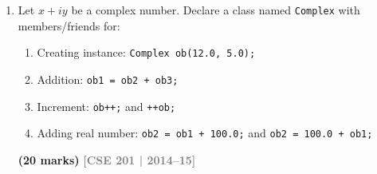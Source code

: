 \documentclass[12pt,a3paper]{article}
\newcommand{\yr}[1]{\hfill\textcolor{gray}{\small\textbf{[#1]}}}
\newcommand{\mk}[1]{\textcolor{orange!70!black}{\small\textbf{(#1 marks)}}}
\begin{document}
\begin{enumerate}
\begin{tcolorbox}
\begin{lstlisting}[language=C++]
    void print() const {
        cout << pointname << "(" << x << "," << y << ")" << endl;
    }
};

int main() {
    Coord ob1, ob2, ob3;
    Coord ob4(0, 0, "origin");

    // (c) ob1 = ob2 + ob3 + ob4
    ob1 = ob2 + ob3 + ob4;
    ob1.print();

    // (c) ob1 = 100 + ob2
    ob1 = 100 + ob2;
    ob1.print();

    // (c) int value = 100 + ob4 (uses conversion)
    int value = (int)(100 + (double)ob4);
    cout << "value = " << value << endl;

    // (d) prefix and postfix
    ++ob1;
    ob1++;
    ob1.print();
    return 0;
}
\end{lstlisting}

\textbf{(b) Why copy constructor works for init but not assignment:}

The copy constructor is called only during \textbf{initialization}
(e.g., \texttt{Coord c2 = c1}). For \textbf{assignment}
(\texttt{c2 = c1} after both are constructed), the
\texttt{operator=} is called instead. Without a custom
\texttt{operator=}, the default does a shallow copy of the
\texttt{char*} pointer, causing double-free bugs --- hence the
explicit \texttt{operator=} above.
\end{tcolorbox}

\item Let $x+iy$ be a complex number. Declare a class named \texttt{Complex} with members/friends for:
\begin{enumerate}
  \item Creating instance: \texttt{Complex ob(12.0, 5.0);}
  \item Addition: \texttt{ob1 = ob2 + ob3;}
  \item Increment: \texttt{ob++;} and \texttt{++ob;}
  \item Adding real number: \texttt{ob2 = ob1 + 100.0;} and \texttt{ob2 = 100.0 + ob1;}
\end{enumerate}
\mk{20}
\yr{CSE 201 | 2014--15}


\begin{tcolorbox}[enhanced,breakable,ansbox,colback=cF!4,colframe=cF,
  boxrule=0.8pt,arc=5pt,
  title={\textbf{Answer --- Complex class (constructor, +, ++, +double both sides)}},
  fonttitle=\bfseries\color{white},colbacktitle=cF]


\end{tcolorbox}
\end{enumerate}
\end{document}
